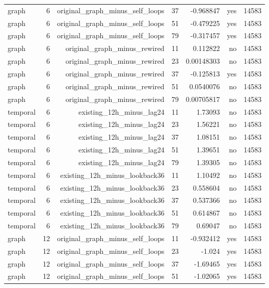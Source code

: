 \begin{tabular}{lrrrrrr}
graph & 6 & original\_graph\_minus\_self\_loops & 37 & -0.968847 & yes & 14583 \\
graph & 6 & original\_graph\_minus\_self\_loops & 51 & -0.479225 & yes & 14583 \\
graph & 6 & original\_graph\_minus\_self\_loops & 79 & -0.317457 & yes & 14583 \\
graph & 6 & original\_graph\_minus\_rewired & 11 & 0.112822 & no & 14583 \\
graph & 6 & original\_graph\_minus\_rewired & 23 & 0.00148303 & no & 14583 \\
graph & 6 & original\_graph\_minus\_rewired & 37 & -0.125813 & yes & 14583 \\
graph & 6 & original\_graph\_minus\_rewired & 51 & 0.0540076 & no & 14583 \\
graph & 6 & original\_graph\_minus\_rewired & 79 & 0.00705817 & no & 14583 \\
temporal & 6 & existing\_12h\_minus\_lag24 & 11 & 1.73093 & no & 14583 \\
temporal & 6 & existing\_12h\_minus\_lag24 & 23 & 1.56221 & no & 14583 \\
temporal & 6 & existing\_12h\_minus\_lag24 & 37 & 1.08151 & no & 14583 \\
temporal & 6 & existing\_12h\_minus\_lag24 & 51 & 1.39651 & no & 14583 \\
temporal & 6 & existing\_12h\_minus\_lag24 & 79 & 1.39305 & no & 14583 \\
temporal & 6 & existing\_12h\_minus\_lookback36 & 11 & 1.10492 & no & 14583 \\
temporal & 6 & existing\_12h\_minus\_lookback36 & 23 & 0.558604 & no & 14583 \\
temporal & 6 & existing\_12h\_minus\_lookback36 & 37 & 0.537366 & no & 14583 \\
temporal & 6 & existing\_12h\_minus\_lookback36 & 51 & 0.614867 & no & 14583 \\
temporal & 6 & existing\_12h\_minus\_lookback36 & 79 & 0.69047 & no & 14583 \\
graph & 12 & original\_graph\_minus\_self\_loops & 11 & -0.932412 & yes & 14583 \\
graph & 12 & original\_graph\_minus\_self\_loops & 23 & -1.024 & yes & 14583 \\
graph & 12 & original\_graph\_minus\_self\_loops & 37 & -1.69465 & yes & 14583 \\
graph & 12 & original\_graph\_minus\_self\_loops & 51 & -1.02065 & yes & 14583 \\

\end{tabular}
